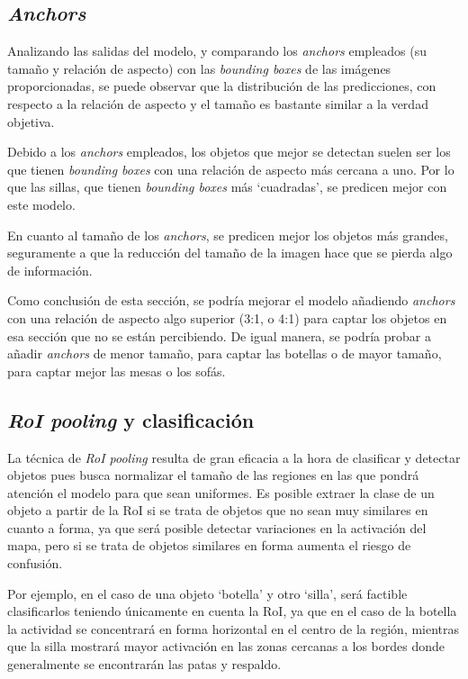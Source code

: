 \subsection{\textit{Anchors}}
    Analizando las salidas del modelo, y comparando los \textit{anchors} empleados 
    (su tamaño y relación de aspecto) con las \textit{bounding boxes} de las imágenes proporcionadas, 
    se puede observar que la distribución de las predicciones, con respecto a la relación de aspecto 
    y el tamaño es bastante similar a la verdad objetiva.

    Debido a los \textit{anchors} empleados, los objetos que mejor se detectan suelen ser 
    los que tienen \textit{bounding boxes} con una relación de aspecto más cercana a uno. 
    Por lo que las sillas, que tienen \textit{bounding boxes} más `cuadradas', se predicen mejor con este modelo.

    En cuanto al tamaño de los \textit{anchors}, se predicen mejor los objetos más grandes, 
    seguramente a que la reducción del tamaño de la imagen hace que se pierda algo de información.

    Como conclusión de esta sección, se podría mejorar el modelo añadiendo 
    \textit{anchors} con una relación de aspecto algo superior (3:1, o 4:1) para captar 
    los objetos en esa sección que no se están percibiendo. De igual manera, 
    se podría probar a añadir \textit{anchors} de menor tamaño, para captar las botellas o de 
    mayor tamaño, para captar mejor las mesas o los sofás.



\subsection {\textit{RoI pooling} y clasificación}
    La técnica de \textit{RoI pooling} resulta de gran eficacia a la hora de clasificar y detectar objetos pues busca normalizar el tamaño de las regiones en las que pondrá atención el modelo para que sean uniformes. Es posible extraer la clase de un objeto a partir de la RoI si se trata de objetos que no sean muy similares en cuanto a forma, ya que será posible detectar variaciones en la activación del mapa, pero si se trata de objetos similares en forma aumenta el riesgo de confusión.

    Por ejemplo, en el caso de una objeto `botella' y otro `silla', será factible clasificarlos teniendo únicamente en cuenta la RoI, ya que en el caso de la botella la actividad se concentrará en forma horizontal en el centro de la región, mientras que la silla mostrará mayor activación en las zonas cercanas a los bordes donde generalmente se encontrarán las patas y respaldo.

